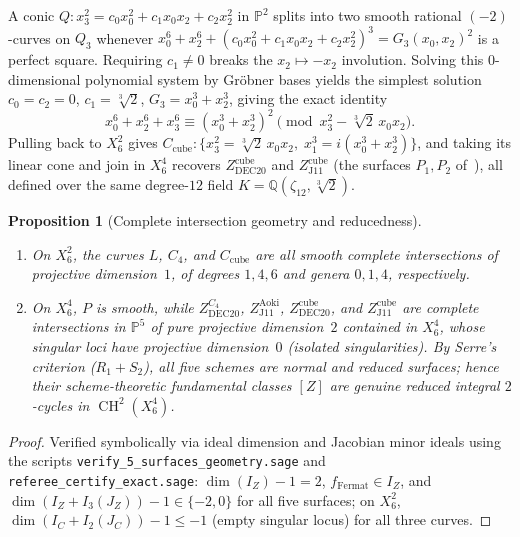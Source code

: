 \documentclass[11pt,a4paper]{amsart}
\newtheorem{proposition}[theorem]{Proposition}
\theoremstyle{definition}
\newcommand{\QQ}{\mathbb{Q}}
\newcommand{\PP}{\mathbb{P}}
\newcommand{\CH}{\operatorname{CH}}
\begin{document}
A conic $Q : x_3^2 = c_0 x_0^2 + c_1 x_0 x_2 + c_2 x_2^2$ in $\PP^2$ splits into two smooth rational $(-2)$-curves on $Q_3$ whenever $x_0^6 + x_2^6 + (c_0 x_0^2 + c_1 x_0 x_2 + c_2 x_2^2)^3 = G_3(x_0, x_2)^2$ is a perfect square. Requiring $c_1 \ne 0$ breaks the $x_2 \mapsto -x_2$ involution. Solving this $0$-dimensional polynomial system by Gr\"obner bases yields the simplest solution $c_0 = c_2 = 0$, $c_1 = \sqrt[3]{2}$, $G_3 = x_0^3 + x_2^3$, giving the exact identity
\[
  x_0^6 + x_2^6 + x_3^6 \equiv (x_0^3 + x_2^3)^2 \pmod{x_3^2 - \sqrt[3]{2}\, x_0 x_2}.
\]
Pulling back to $X_6^2$ gives $C_{\mathrm{cube}} : \{x_3^2 = \sqrt[3]{2}\, x_0 x_2,\; x_1^3 = i(x_0^3 + x_2^3)\}$, and taking its linear cone and join in $X_6^4$ recovers $Z_{\mathrm{DEC20}}^{\mathrm{cube}}$ and $Z_{\mathrm{J11}}^{\mathrm{cube}}$ (the surfaces $P_1, P_2$ of~\cite{BFLGVL24,SdJ26}), all defined over the same degree-$12$ field $K = \QQ(\zeta_{12}, \sqrt[3]{2})$.

\begin{proposition}[Complete intersection geometry and reducedness]\label{prop:geometry}
\begin{enumerate}
  \item On $X_6^2$, the curves $L$, $C_4$, and $C_{\mathrm{cube}}$ are all smooth complete intersections of projective dimension~$1$, of degrees $1, 4, 6$ and genera $0, 1, 4$, respectively.
  \item On $X_6^4$, $P$ is smooth, while $Z_{\mathrm{DEC20}}^{C_4}$, $Z_{\mathrm{J11}}^{\mathrm{Aoki}}$, $Z_{\mathrm{DEC20}}^{\mathrm{cube}}$, and $Z_{\mathrm{J11}}^{\mathrm{cube}}$ are complete intersections in $\PP^5$ of pure projective dimension~$2$ contained in $X_6^4$, whose singular loci have projective dimension~$0$ (isolated singularities). By Serre's criterion ($R_1 + S_2$), all five schemes are normal and reduced surfaces; hence their scheme-theoretic fundamental classes $[Z]$ are genuine reduced integral $2$-cycles in $\CH^2(X_6^4)$.
\end{enumerate}
\end{proposition}
\begin{proof}
Verified symbolically via ideal dimension and Jacobian minor ideals using the scripts \texttt{verify\_5\_surfaces\_geometry.sage} and \texttt{referee\_certify\_exact.sage}:
$\dim(I_Z) - 1 = 2$, $f_{\mathrm{Fermat}} \in I_Z$, and $\dim(I_Z + I_3(J_Z)) - 1 \in \{-2, 0\}$ for all five surfaces; on $X_6^2$, $\dim(I_C + I_2(J_C)) - 1 \le -1$ (empty singular locus) for all three curves.
\end{proof}
\end{document}
